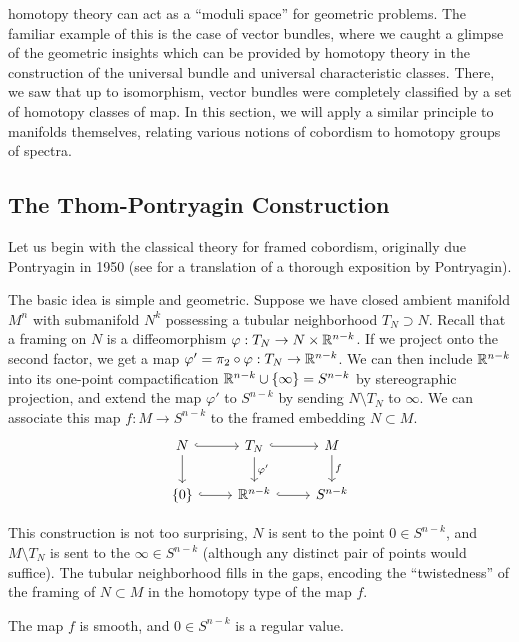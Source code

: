 homotopy theory can act as a ``moduli space'' for geometric problems. The familiar example of this is the case of vector bundles, where we caught a glimpse of the geometric insights which can be provided by homotopy theory in the construction of the universal bundle and universal characteristic classes. There, we saw that up to isomorphism, vector bundles were completely classified by a set of homotopy classes of map.
In this section, we will apply a similar principle to manifolds themselves, relating various notions of cobordism to homotopy groups of spectra.

\subsection{The Thom-Pontryagin Construction}

Let us begin with the classical theory for framed cobordism, originally due Pontryagin in 1950 (see \cite{pontryagin1959homotopy} for a translation of a thorough exposition by Pontryagin). 

The basic idea is simple and geometric. Suppose we have closed ambient manifold $M^n$ with submanifold $N^k$ possessing a tubular neighborhood $T_N\supset N$. Recall that a framing on $N$ is a diffeomorphism $\varphi : T_N \to N\times \mathbb{R}^{n-k}$. If we project onto the second factor, we get a map $\varphi'=\pi_2\circ \varphi : T_N \to \mathbb{R}^{n-k}$. We can then include $\mathbb{R}^{n-k}$ into its one-point compactification $\mathbb{R}^{n-k}\cup \{\infty\}=S^{n-k}$ by stereographic projection, and extend the map $\varphi'$ to $S^{n-k}$ by sending $N\setminus T_N$ to $\infty$. We can associate this map $f : M \to S^{n-k}$ to the framed embedding $N\subset M$.
\[\begin{tikzcd}
	N & {T_N} & M \\
	{\{0\}} & {\R^{n-k}} & {S^{n-k}}
	\arrow[hook, from=1-1, to=1-2]
	\arrow[from=1-1, to=2-1]
	\arrow[hook, from=1-2, to=1-3]
	\arrow["{\varphi'}", from=1-2, to=2-2]
	\arrow["f", from=1-3, to=2-3]
	\arrow[hook, from=2-1, to=2-2]
	\arrow[hook, from=2-2, to=2-3]
\end{tikzcd}\]

This construction is not too surprising, $N$ is sent to the point $0\in S^{n-k}$, and $M\setminus T_N$ is sent to the $\infty \in S^{n-k}$ (although any distinct pair of points would suffice). The tubular neighborhood fills in the gaps, encoding the ``twistedness'' of the framing of $N\subset M$ in the homotopy type of the map $f$.

\begin{proposition}
	The map $f$ is smooth, and $0\in S^{n-k}$ is a regular value.
\end{proposition}

